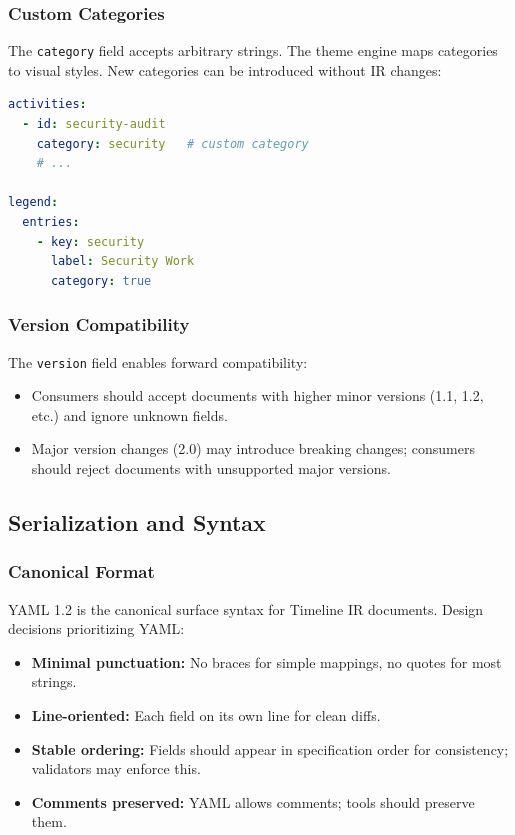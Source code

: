 \subsubsection{Custom Categories}

The \texttt{category} field accepts arbitrary strings. The theme engine maps
categories to visual styles. New categories can be introduced without IR changes:

\begin{lstlisting}[language=yaml]
activities:
  - id: security-audit
    category: security   # custom category
    # ...

legend:
  entries:
    - key: security
      label: Security Work
      category: true
\end{lstlisting}

\subsubsection{Version Compatibility}

The \texttt{version} field enables forward compatibility:

\begin{itemize}
  \item Consumers should accept documents with higher minor versions (1.1, 1.2, etc.)
        and ignore unknown fields.
  \item Major version changes (2.0) may introduce breaking changes; consumers should
        reject documents with unsupported major versions.
\end{itemize}

\subsection{Serialization and Syntax}
\label{sec:ir-serialization}

\subsubsection{Canonical Format}

YAML 1.2 is the canonical surface syntax for Timeline IR documents. Design decisions
prioritizing YAML:

\begin{itemize}
  \item \textbf{Minimal punctuation:} No braces for simple mappings, no quotes for
        most strings.
  \item \textbf{Line-oriented:} Each field on its own line for clean diffs.
  \item \textbf{Stable ordering:} Fields should appear in specification order for
        consistency; validators may enforce this.
  \item \textbf{Comments preserved:} YAML allows comments; tools should preserve them.
\end{itemize}

